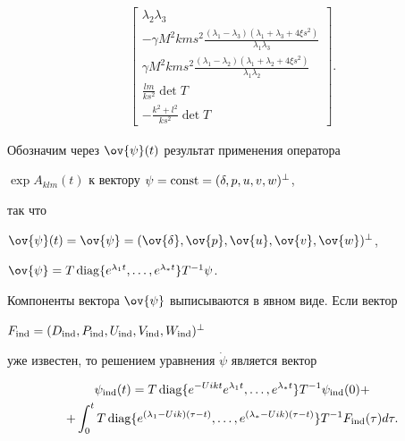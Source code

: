 \begin{gather*}
\begin{bmatrix}
{\lambda_2\lambda_3}\\


-\gamma M^2kms^2\frac{(\lambda_1-\lambda_3)(\lambda_1+\lambda_3+4\xi s^2)}


{\lambda_1\lambda_3}\\


\gamma M^2kms^2\frac{(\lambda_1-\lambda_2)(\lambda_1+\lambda_2+4\xi s^2)}


{\lambda_1\lambda_2}\\


\frac{lm}{ks^2}\det T\\


-\frac{k^2+l^2}{ks^2}\det T


\end{bmatrix}


.


\end{gather*}





Обозначим через $\ov{\psi}(t)$ результат применения оператора


$\exp A_{klm}(t)$ к вектору $\psi=\operatorname{const}=(\delta,p,u,v,w)^{\perp}$,


так что


$\ov{\psi}(t)=\ov{\psi}=(\ov{\delta},\ov{p},\ov{u},\ov{v},


\ov{w})^{\perp}$,


$\ov{\psi}=T \diag\{e^{\lambda_1t},\dotsc,e^{\lambda_*t}\}T^{-1}\psi$.


Компоненты вектора $\ov{\psi}$ выписываются в явном виде. Если вектор


$F_{\operatorname{ind}}=(D_{\operatorname{ind}},P_{\operatorname{ind}},U_{\operatorname{ind}},V_{\operatorname{ind}},W_{\operatorname{ind}})^{\perp}$


уже известен, то решением уравнения $\Dot{\psi}$ является вектор


\begin{multline*}


\psi_{\ind}(t)=T \diag\{e^{-Uikt}e^{\lambda_1t},\dotsc,e^{\lambda_*t}\}


T^{-1}\psi_{\ind}(0)+\\


%


+\int_{0}^{t} T \diag \{e^{(\lambda_1-Uik)


(\tau-t)},\dotsc,e^{(\lambda_*-Uik)(\tau-t)} \} T^{-1} F_{\ind}(\tau)d\tau.


\end{multline*}





